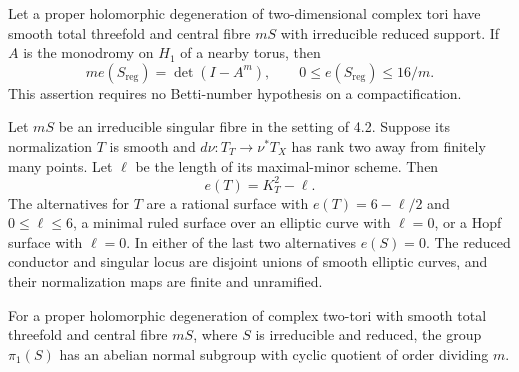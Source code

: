 
\begin{proposition}[P4.13]\hypertarget{tag-02WK}{}\label{night:P4.13}\label{stmt:P4.13}


Let a proper holomorphic degeneration of two-dimensional complex
tori have smooth total threefold and central fibre $mS$ with
irreducible reduced support. If $A$ is the monodromy on $H_1$ of
a nearby torus, then
\[
 m e(S_{\mathrm{reg}})=\det(I-A^m),\qquad
 0\le e(S_{\mathrm{reg}})\le16/m.
\]
This assertion requires no Betti-number hypothesis on a compactification.
\end{proposition}

\begin{proposition}[P4.15]\hypertarget{tag-02WM}{}\label{night:P4.15}\label{stmt:P4.15}


Let $mS$ be an irreducible singular fibre in the setting of 4.2.
Suppose its normalization $T$ is smooth and $d\nu:T_T\to\nu^*T_X$
has rank two away from finitely many points. Let $\ell$ be the
length of its maximal-minor scheme. Then
\[
 e(T)=K_T^2-\ell.
\]
The alternatives for $T$ are a rational surface with
$e(T)=6-\ell/2$ and $0\leq\ell\leq6$, a minimal ruled surface
over an elliptic curve with $\ell=0$, or a Hopf surface with
$\ell=0$. In either of the last two alternatives $e(S)=0$.
The reduced conductor and singular locus are disjoint unions of
smooth elliptic curves, and their normalization maps are finite
and unramified.
\end{proposition}

\begin{proposition}[P4R.1]\hypertarget{tag-02Y2}{}\label{night:P4R.1}\label{stmt:P4R.1}


For a proper holomorphic degeneration of complex two-tori with
smooth total threefold and central fibre $mS$, where $S$ is
irreducible and reduced, the group $\pi_1(S)$ has an abelian
normal subgroup with cyclic quotient of order dividing $m$.
\end{proposition}

